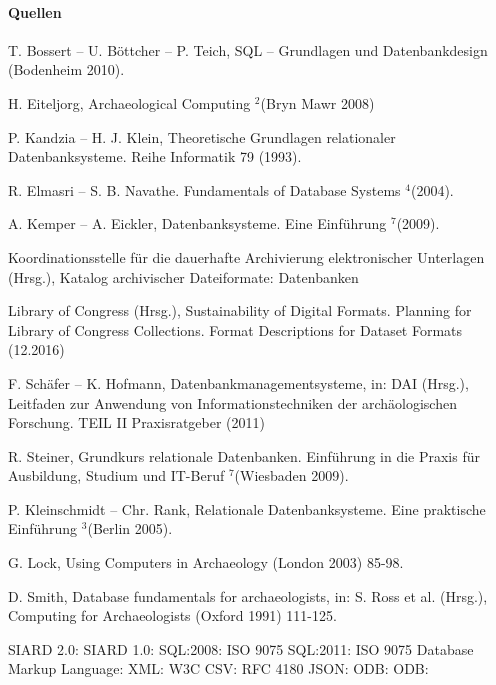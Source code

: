
\paragraph{Quellen}
\begin{flushleft}
T. Bossert -- U. Böttcher -- P. Teich, SQL -- Grundlagen und Datenbankdesign (Bodenheim 2010).

H. Eiteljorg, Archaeological Computing $^2$(Bryn Mawr 2008) 

P. Kandzia -- H. J. Klein, Theoretische Grundlagen relationaler Datenbanksysteme. Reihe Informatik 79 (1993).

R. Elmasri -- S. B. Navathe. Fundamentals of Database Systems $^4$(2004).

A. Kemper -- A. Eickler, Datenbanksysteme. Eine Einführung $^7$(2009).

Koordinationsstelle für die dauerhafte Archivierung elektronischer Unterlagen (Hrsg.), Katalog archivischer Dateiformate: Datenbanken 

Library of Congress (Hrsg.), Sustainability of Digital Formats. Planning for Library of Congress Collections. Format Descriptions for Dataset Formats (12.2016) 

F. Schäfer -- K. Hofmann, Datenbankmanagementsysteme, in: DAI (Hrsg.), Leitfaden zur Anwendung von Informationstechniken der archäologischen Forschung. TEIL II Praxisratgeber (2011) 

R. Steiner, Grundkurs relationale Datenbanken. Einführung in die Praxis für Ausbildung, Studium und IT-Beruf $^7$(Wiesbaden 2009).

P. Kleinschmidt -- Chr. Rank, Relationale Datenbanksysteme. Eine praktische Einführung $^3$(Berlin 2005).

G. Lock, Using Computers in Archaeology (London 2003) 85-98.

D. Smith, Database fundamentals for archaeologists, in: S. Ross et al. (Hrsg.), Computing for Archaeologists (Oxford 1991) 111-125.
	

SIARD 2.0: 
SIARD 1.0: 
SQL:2008: ISO 9075 
SQL:2011: ISO 9075 
Database Markup Language: 
XML: W3C  
CSV: RFC 4180 
JSON: 
ODB: 
ODB: 


\end{flushleft}
